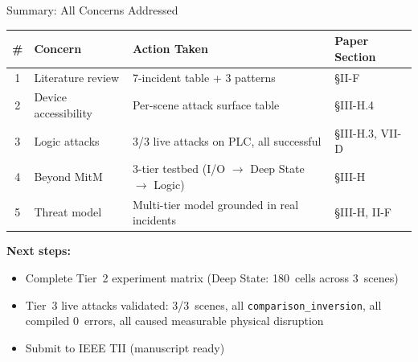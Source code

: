 \documentclass[aspectratio=169,10pt]{beamer}
\begin{document}
\begin{frame}{Summary: All Concerns Addressed}

\begin{table}
\centering
\small
\begin{tabular}{@{}clll@{}}
\toprule
\textbf{\#} & \textbf{Concern} & \textbf{Action Taken} & \textbf{Paper Section} \\
\midrule
1 & Literature review & 7-incident table + 3 patterns & \S II-F \\
2 & Device accessibility & Per-scene attack surface table & \S III-H.4 \\
3 & Logic attacks & 3/3 live attacks on PLC, all successful & \S III-H.3, VII-D \\
4 & Beyond MitM & 3-tier testbed (I/O $\rightarrow$ Deep State $\rightarrow$ Logic) & \S III-H \\
5 & Threat model & Multi-tier model grounded in real incidents & \S III-H, II-F \\
\bottomrule
\end{tabular}
\end{table}

\vspace{0.5em}
\textbf{Next steps:}
\begin{itemize}
    \item Complete Tier~2 experiment matrix (Deep State: 180~cells across 3~scenes)
    \item Tier~3 live attacks validated: 3/3~scenes, all \texttt{comparison\_inversion}, all compiled 0~errors, all caused measurable physical disruption
    \item Submit to IEEE TII (manuscript ready)
\end{itemize}
\end{frame}
\end{document}
